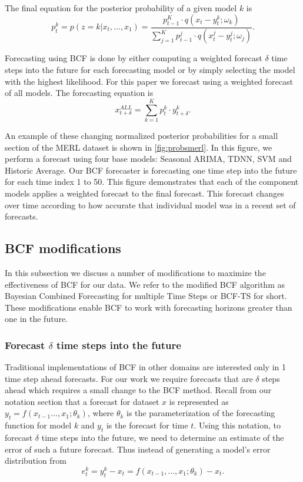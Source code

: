 The final equation for the posterior probability of a given model $k$ is
\begin{equation}
\label{eq:model_prob}
p_{t}^{k} = p(z = k|x_{t}, ..., x_{1}) = \frac{p_{t - 1}^{K} \cdot q(x_{t} - y_{t}^{k}; \omega_{k})}{\sum_{j=1}^{K}p_{t - 1}^{j} \cdot q(x_{t}^{j} - y_{t}^{j}; \omega_{j})}.
\end{equation}

Forecasting using BCF is done by either computing a weighted forecast $\delta$ time steps into the future for each forecasting model or by simply selecting the model with the highest likelihood.  For this paper we forecast using a weighted forecast of all models.  The forecasting equation is
\begin{equation}
x_{t + \delta}^{ALL} = \sum_{k=1}^{K}p_{t}^{k} \cdot y_{t + \delta}^{k}.
\end{equation}

An example of these changing normalized posterior probabilities for a small section of the MERL dataset is shown in \ref{fig:probsmerl}.  In this figure, we perform a forecast using four base models: Seasonal ARIMA, TDNN, SVM and Historic Average.  Our BCF forecaster is forecasting one time step into the future for each time index 1 to 50.  This figure demonstrates that each of the component models applies a weighted forecast to the final forecast.  This forecast changes over time according to how accurate that individual model was in a recent set of forecasts.


\subsection{BCF modifications}
In this subsection we discuss a number of modifications to maximize the effectiveness of BCF for our data.  We refer to the modified BCF algorithm as Bayesian Combined Forecasting for multiple Time Steps or BCF-TS for short.  These modifications  enable BCF to work with forecasting horizons greater than one in the future.

\subsubsection{Forecast $\delta$ time steps into the future}
Traditional implementations of BCF in other domains \cite{Petridis2001, Zheng2006} are interested only in 1 time step ahead forecasts.  For our work we require forecasts that are $\delta$ steps ahead which requires a small change to the BCF method.  Recall from our notation section that a forecast for dataset $x$ is represented as $y_{t} = f(x_{t - 1} ..., x_{1}; \theta_{k})$, where $\theta_{k}$ is the parameterization of the forecasting function for model $k$ and $y_{t}$ is the forecast for time $t$.  Using this notation, to forecast $\delta$ time steps into the future, we need to determine an estimate of the error of such a future forecast.  Thus instead of generating a model's error distribution from 
\begin{equation}
e_{t}^{k} = y_{t}^{k} - x_{t} = f(x_{t - 1}, ..., x_{1}; \theta_{k}) - x_{t}.
\end{equation}

